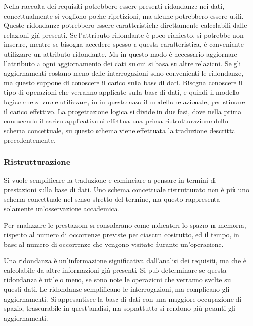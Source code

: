 \documentclass{article}
\numberwithin{equation}{subsection}
\begin{document}


Nella raccolta dei requisiti potrebbero essere presenti ridondanze nei dati, concettualmente si vogliono poche ripetizioni, ma alcune potrebbero essere utili. Queste ridondanze potrebbero essere 
caratteristiche direttamente calcolabili dalle relazioni già presenti. Se l'attributo ridondante è poco richiesto, si potrebbe non inserire, mentre se bisogna 
accedere spesso a questa caratteristica, è conveniente utilizzare un attributo ridondante. Ma in questo modo è necessario aggiornare l'attributo a ogni aggiornamento dei dati 
su cui si basa su altre relazioni. Se gli aggiornamenti costano meno delle interrogazioni sono convenienti le ridondanze, ma questo suppone di conoscere il carico sulla 
base di dati. Bisogna conoscere il tipo di operazioni che verranno applicate sulla base di dati, e quindi il modello logico che si vuole utilizzare, in in questo caso 
il modello relazionale, per stimare il carico effettivo. 
La progettazione logica si divide in due fasi, dove nella prima conoscendo il carico applicativo si effettua una prima ristrutturazione dello schema concettuale, su questo schema viene effettuata la traduzione descritta precedentemente. 

\subsubsection{Ristrutturazione}

Si vuole semplificare la traduzione e cominciare a pensare in termini di prestazioni sulla base di dati. Uno schema concettuale ristrutturato non è più uno schema concettuale nel senso stretto del termine, ma questo rappresenta solamente un'osservazione accademica. 

Per analizzare le prestazioni si considerano come indicatori lo spazio in memoria, rispetto al numero di occorrenze previste per ciascun costrutto, ed il tempo, in base al numero di occorrenze che vengono visitate durante un'operazione. 

Una ridondanza è un'informazione significativa dall'analisi dei requisiti, ma che è calcolabile da altre informazioni già presenti. Si può determinare se questa ridondanza è utile o meno, se sono note le operazioni che verranno svolte su questi dati. Le ridondanze semplificano le interrogazioni, ma complicano gli aggiornamenti. Si appesantisce la base di dati con una maggiore occupazione di spazio, trascurabile in quest'analisi, ma soprattutto si rendono più pesanti gli aggiornamenti. 
\end{document}
